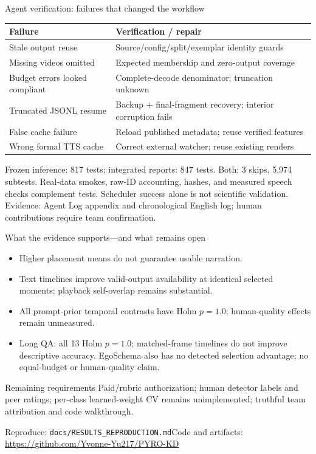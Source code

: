 \documentclass[aspectratio=169,11pt]{beamer}
\newcommand{\source}[1]{\vfill{\tiny\color{gray}Evidence: #1}}
\begin{document}
\begin{frame}{Agent verification: failures that changed the workflow}
\begin{tabular}{p{}p{}}
\toprule Failure & Verification / repair \\
\midrule Stale output reuse & Source/config/split/exemplar identity guards \\
Missing videos omitted & Expected membership and zero-output coverage \\
Budget errors looked compliant & Complete-decode denominator; truncation unknown \\
Truncated JSONL resume & Backup + final-fragment recovery; interior corruption fails \\
False cache failure & Reload published metadata; reuse verified features \\
Wrong formal TTS cache & Correct external watcher; reuse existing renders \\
\bottomrule
\end{tabular}
\vspace{4mm}
\small Frozen inference: 817 tests; integrated reports: 847 tests. Both: 3 skips, 5,974 subtests. Real-data smokes, raw-ID accounting, hashes, and measured speech checks complement tests. Scheduler success alone is not scientific validation.
\source{Agent Log appendix and chronological English log; human contributions require team confirmation.}
\end{frame}

\begin{frame}{What the evidence supports—and what remains open}
\begin{itemize}
\item Higher placement means do not guarantee usable narration.
\item Text timelines improve valid-output availability at identical selected moments; playback self-overlap remains substantial.
\item All prompt-prior temporal contrasts have Holm $p=1.0$; human-quality effects remain unmeasured.
\item Long QA: all 13 Holm $p=1.0$; matched-frame timelines do not improve descriptive accuracy. EgoSchema also has no detected selection advantage; no equal-budget or human-quality claim.
\end{itemize}
\begin{block}{Remaining requirements}
Paid/rubric authorization; human detector labels and peer ratings; per-class learned-weight CV remains unimplemented; truthful team attribution and code walkthrough.
\end{block}
\small Reproduce: \texttt{docs/RESULTS\_REPRODUCTION.md}\newline Code and artifacts: \url{https://github.com/Yvonne-Yu217/PYRO-KD}
\end{frame}
\end{document}
